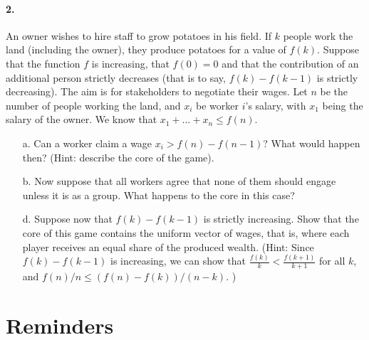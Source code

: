 \documentclass[a4paper,notitlepage,11pt]{article}
\begin{document}
\paragraph{2. } An owner wishes to hire staff to grow potatoes in his field. If $k$ people work the land (including the owner), they produce potatoes for a value of $f(k)$. Suppose that the function $f$ is increasing, that $f(0) = 0$ and that the contribution of an additional person strictly decreases (that is to say, $f(k) - f(k-1)$ is strictly decreasing). The aim is for stakeholders to negotiate their wages. Let $n$ be the number of people working the land, and $x_i$ be worker $i$'s salary, with $x_1$ being the salary of the owner. We know that $x_1 + \dots + x_n \leq f(n)$.
\begin{enumerate}
	\item[a.] Can a worker claim a wage $x_i > f(n) - f(n-1)$? What would happen then? (Hint: describe the core of the game).
	\item[b.] Now suppose that all workers agree that none of them should engage unless it is as a group. What happens to the core in this case?
	\item[d.] Suppose now that $f(k) - f(k-1)$ is strictly increasing. Show that the core of this game contains the uniform vector of wages, that is, where each player receives an equal share of the produced wealth. (Hint: Since $f(k) - f(k-1)$ is increasing, we can show that  $\frac{f(k)}{k} < \frac{f(k + 1)}{k + 1} $ for all $k$, and $f(n)/n \leq (f(n) - f(k))/(n-k)$. )
\end{enumerate}
	


\section*{Reminders}
\end{document}

